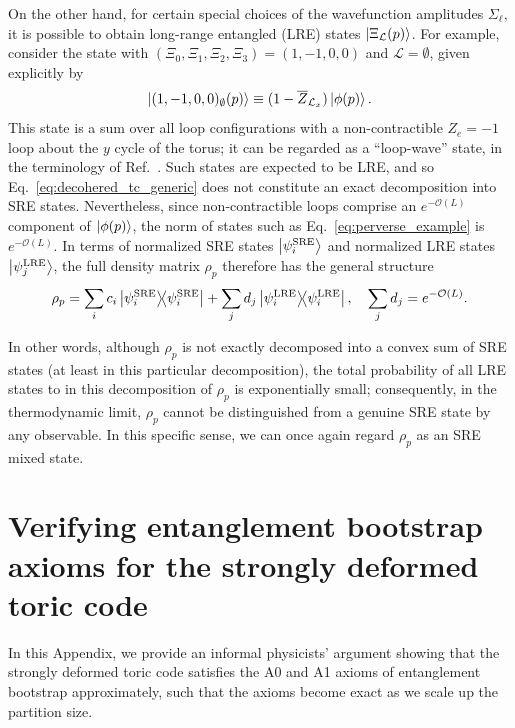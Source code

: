 On the other hand, for certain special choices of the wavefunction amplitudes $\Sigma_{\ell}$, it is possible to obtain long-range entangled (LRE) states $\ket{\Xi_{\mathcal{L}}(p)}$. For example, consider the state with $(\Xi_0, \Xi_1, \Xi_2, \Xi_3) = (1,-1,0,0)$ and $\mathcal{L} = \emptyset$, given explicitly by
\begin{equation}
\label{eq:perverse_example}
    \ket{(1,-1,0,0)_{\emptyset}(p)} \equiv (1 - \overline{Z}_{\mathcal{L}_x}) \ket{\phi(p)} .
\end{equation}
This state is a sum over all loop configurations with a non-contractible $Z_e = -1$ loop about the $y$ cycle of the torus; it can be regarded as a ``loop-wave'' state, in the terminology of Ref.~. Such states are expected to be LRE, and so Eq.~\eqref{eq:decohered_tc_generic} does not constitute an exact decomposition into SRE states. Nevertheless, since non-contractible loops comprise an $e^{-\mathcal{O}(L)}$ component of $\ket{\phi(p)}$, the norm of states such as Eq.~\eqref{eq:perverse_example} is $e^{-\mathcal{O}(L)}$. In terms of normalized SRE states $\ket{\psi_i^{\text{SRE}}}$ and normalized LRE states $\ket{\psi^{\text{LRE}}_j}$, the full density matrix $\rho_p$ therefore has the general structure
\begin{equation}
    \rho_p = \sum_i c_i \dyad{\psi_i^{\text{SRE}}} + \sum_j d_j \dyad{\psi_i^{\text{LRE}}}, \quad \sum_j d_j = e^{-\mathcal{O}(L)} .
\end{equation}

In other words, although $\rho_p$ is not exactly decomposed into a convex sum of SRE states (at least in this particular decomposition), the total probability of all LRE states to in this decomposition of $\rho_p$ is exponentially small; consequently, in the thermodynamic limit, $\rho_p$ cannot be distinguished from a genuine SRE state by any observable. In this specific sense, we can once again regard $\rho_p$ as an SRE mixed state.
















\section{Verifying entanglement bootstrap axioms for the strongly deformed toric code}
In this Appendix, we provide an informal physicists' argument showing that the strongly deformed toric code satisfies the A0 and A1 axioms of entanglement bootstrap \cite{Shi_fusion_2020,Shi_Kim_2021,Kim_Lin_Ranard_Shi_2024} approximately, such that the axioms become exact as we scale up the partition size. 

